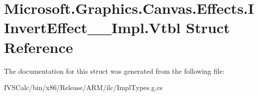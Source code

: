 \hypertarget{struct_microsoft_1_1_graphics_1_1_canvas_1_1_effects_1_1_i_invert_effect_____impl_1_1_vtbl}{}\section{Microsoft.\+Graphics.\+Canvas.\+Effects.\+I\+Invert\+Effect\+\_\+\+\_\+\+Impl.\+Vtbl Struct Reference}
\label{struct_microsoft_1_1_graphics_1_1_canvas_1_1_effects_1_1_i_invert_effect_____impl_1_1_vtbl}


The documentation for this struct was generated from the following file\+:\begin{DoxyCompactItemize}
\item 
I\+V\+S\+Calc/bin/x86/\+Release/\+A\+R\+M/ilc/Impl\+Types.\+g.\+cs\end{DoxyCompactItemize}
